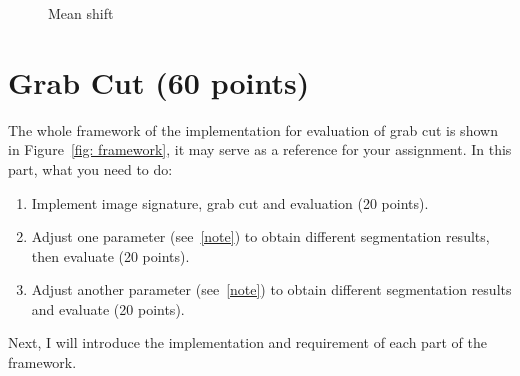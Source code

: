 \documentclass[12pt]{article}
\begin{document}
\begin{figure}[!ht]
\centering
  \caption{Mean shift}
  \label{fig: result2} %
\end{figure}


\section{Grab Cut (60 points)}

The whole framework of the implementation for evaluation of grab cut is shown in Figure~\ref{fig: framework}, it may serve as a reference for your assignment.
In this part, what you need to do:
\begin{enumerate}
\item Implement image signature, grab cut and evaluation (20 points).
\item Adjust one parameter (see~\ref{note}) to obtain different segmentation results, then evaluate (20 points).
\item Adjust another parameter (see~\ref{note}) to obtain different segmentation results and evaluate (20 points).
\end{enumerate}
Next, I will introduce the implementation and requirement of each part of the framework.
\end{document}
